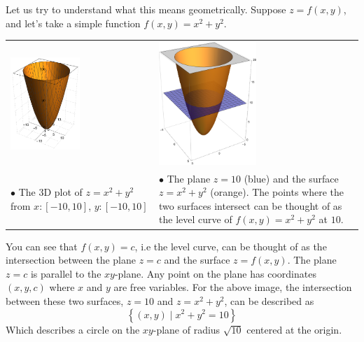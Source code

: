\documentclass[14pt]{article}
\begin{document}
	Let us try to understand what this means geometrically. Suppose $z=f(x, y)$, and let's take a simple function $f(x, y) = x^2 + y^2$. 
	
	\begin{center}
		\begin{tabular}{l l}
			\includegraphics[width=0.5\textwidth]{3d-graph_2} & \includegraphics[width=0.5\textwidth]{3d-graph_3}\\
			$\bullet$ \footnotesize The 3D plot of $z = x^2 + y^2$ from $x: [-10, 10]$, $y: [-10, 10]$ & $\bullet$ \footnotesize The plane $z = 10$ (blue) and the surface $z = x^2 + y^2$ (orange). The points where the two surfaces intersect can be thought of as the level curve of $f(x, y) = x^2 + y^2$ at $10$.
		\end{tabular}
	\end{center}
	You can see that $f(x, y) = c$, i.e the level curve, can be thought of as the intersection between the plane $z = c$ and the surface $z = f(x, y)$. The plane $z=c$ is parallel to the $xy$-plane. Any point on the plane has coordinates $(x, y, c)$ where $x$ and $y$ are free variables. For the above image, the intersection between these two surfaces, $z = 10$ and $z = x^2 + y^2$, can be described as 
	\begin{equation*}
		\left\{ (x, y) \mid x^2 + y^2 = 10 \right\} 
	\end{equation*}
	Which describes a circle on the $xy$-plane of radius $\sqrt{10}$ centered at the origin.
	 
\end{document}
